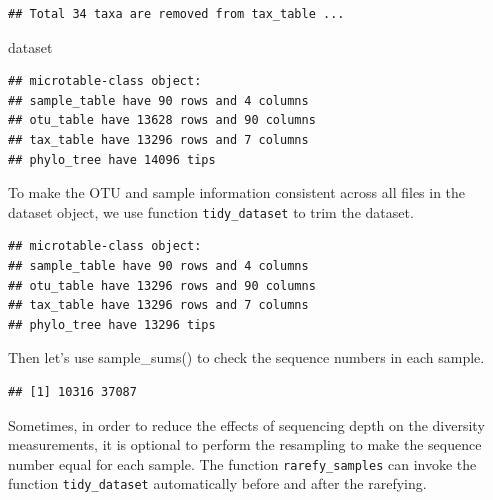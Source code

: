 \documentclass[
]{book}
\newenvironment{Shaded}{\begin{snugshade}}{\end{snugshade}}
\newcommand{\FunctionTok}[1]{\textcolor[rgb]{0.00,0.00,0.00}{#1}}
\newcommand{\NormalTok}[1]{#1}
\newcommand{\SpecialCharTok}[1]{\textcolor[rgb]{0.00,0.00,0.00}{#1}}
\begin{document}
\begin{verbatim}
## Total 34 taxa are removed from tax_table ...
\end{verbatim}

\begin{Shaded}
\begin{Highlighting}[]
\NormalTok{dataset}
\end{Highlighting}
\end{Shaded}

\begin{verbatim}
## microtable-class object:
## sample_table have 90 rows and 4 columns
## otu_table have 13628 rows and 90 columns
## tax_table have 13296 rows and 7 columns
## phylo_tree have 14096 tips
\end{verbatim}

To make the OTU and sample information consistent across all files in the dataset object, we use function \texttt{tidy\_dataset} to trim the dataset.

\begin{Shaded}
\end{Shaded}

\begin{verbatim}
## microtable-class object:
## sample_table have 90 rows and 4 columns
## otu_table have 13296 rows and 90 columns
## tax_table have 13296 rows and 7 columns
## phylo_tree have 13296 tips
\end{verbatim}

Then let's use sample\_sums() to check the sequence numbers in each sample.

\begin{Shaded}
\end{Shaded}

\begin{verbatim}
## [1] 10316 37087
\end{verbatim}

Sometimes, in order to reduce the effects of sequencing depth on the diversity measurements,
it is optional to perform the resampling to make the sequence number equal for each sample.
The function \texttt{rarefy\_samples} can invoke the function \texttt{tidy\_dataset} automatically before and after the rarefying.
\end{document}
